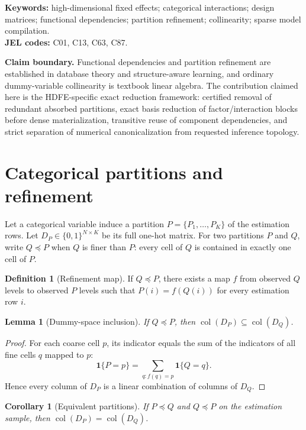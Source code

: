 \documentclass[11pt]{article}
\newtheorem{lemma}[theorem]{Lemma}
\newtheorem{corollary}[theorem]{Corollary}
\theoremstyle{definition}
\newtheorem{definition}[theorem]{Definition}
\newcommand{\col}{\operatorname{col}}
\newcommand{\1}{\mathbf{1}}
\begin{document}
\noindent\textbf{Keywords:} high-dimensional fixed effects; categorical interactions; design matrices; functional dependencies; partition refinement; collinearity; sparse model compilation.\\
\textbf{JEL codes:} C01, C13, C63, C87.

\vspace{0.5em}
\noindent\textbf{Claim boundary.} Functional dependencies and partition refinement are established in database theory and structure-aware learning, and ordinary dummy-variable collinearity is textbook linear algebra. The contribution claimed here is the HDFE-specific exact reduction framework: certified removal of redundant absorbed partitions, exact basis reduction of factor/interaction blocks before dense materialization, transitive reuse of component dependencies, and strict separation of numerical canonicalization from requested inference topology.

\section{Categorical partitions and refinement}

Let a categorical variable induce a partition $P=\{P_1,\dots,P_K\}$ of the estimation rows. Let $D_P\in\{0,1\}^{N\times K}$ be its full one-hot matrix. For two partitions $P$ and $Q$, write $Q\preceq P$ when $Q$ is finer than $P$: every cell of $Q$ is contained in exactly one cell of $P$.

\begin{definition}[Refinement map]
If $Q\preceq P$, there exists a map $f$ from observed $Q$ levels to observed $P$ levels such that $P(i)=f(Q(i))$ for every estimation row $i$.
\end{definition}

\begin{lemma}[Dummy-space inclusion]\label{lem:dummy}
If $Q\preceq P$, then $\col(D_P)\subseteq\col(D_Q)$.
\end{lemma}
\begin{proof}
For each coarse cell $p$, its indicator equals the sum of the indicators of all fine cells $q$ mapped to $p$:
\[
  \1\{P=p\}=\sum_{q:f(q)=p}\1\{Q=q\}.
\]
Hence every column of $D_P$ is a linear combination of columns of $D_Q$.
\end{proof}

\begin{corollary}[Equivalent partitions]
If $P\preceq Q$ and $Q\preceq P$ on the estimation sample, then $\col(D_P)=\col(D_Q)$.
\end{corollary}
\end{document}
